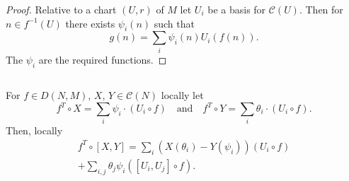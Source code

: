 \begin{proof}
Relative to a chart $(U,r)$ of $M$ let $U_{i}$ be a basis for
$\mathscr{C}(U)$. Then for $n\in f^{-1}(U)$ there exists $\psi_{i}(n)$
such that 
$$
g(n)=\sum_{i}\psi_{i}(n)U_{i}(f(n)).
$$
The $\psi_{i}$ are the required functions.
\end{proof}

\setcounter{subsection}{13}

\subsection{}\label{chap2:2.5.14} 

\begin{lemma*}
For $f\in D(N,M)$, $X$, $Y\in \mathscr{C}(N)$ locally let
$$
f^{T}\circ X=\sum_{i}\psi_{i}\cdot (U_{i}\circ f)\quad\text{and}\quad
f^{T}\circ Y=\sum_{i}\theta_{i}\cdot (U_{i}\circ f). 
$$
Then, locally
\begin{gather*}
f^{T}\circ [X,Y]=\sum_{i}(X(\theta_{i})-Y(\psi_{i}))(U_{i}\circ f)\\
+\sum_{i,j}\theta_{j}\psi_{i}([U_{i},U_{j}]\circ f).
\end{gather*}
\end{lemma*}

